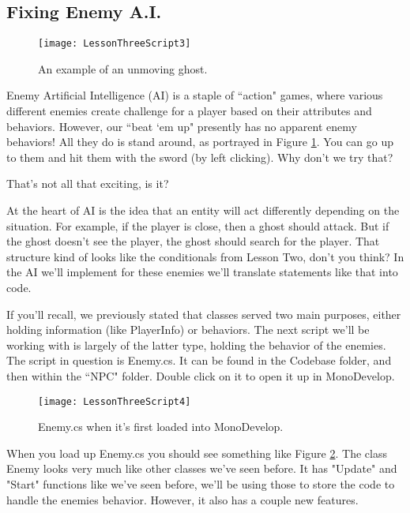 \documentclass{article}
\begin{document}
\subsection{Fixing Enemy A.I.}

\begin{figure}
  \texttt{[image: LessonThreeScript3]}
  \caption{An example of an unmoving ghost.}
  \label{fig:LessonThreeScript3}
\end{figure}

Enemy Artificial Intelligence (AI) is a staple of ``action" games, where various different enemies create challenge for a player based on their attributes and behaviors. However, our ``beat `em up" presently has no apparent enemy behaviors! All they do is stand around, as portrayed in Figure \ref{fig:LessonThreeScript3}. You can go up to them and hit them with the sword (by left clicking). Why don't we try that?

\noindent{}

That's not all that exciting, is it?

At the heart of AI is the idea that an entity will act differently depending on the situation. For example, if the player is close, then a ghost should attack. But if the ghost doesn't see the player, the ghost should search for the player. That structure kind of looks like the conditionals from Lesson Two, don't you think? In the AI we'll implement for these enemies we'll translate statements like that into code.

If you'll recall, we previously stated that classes served two main purposes, either holding information (like PlayerInfo) or behaviors. The next script we'll be working with is largely of the latter type, holding the behavior of the enemies. The script in question is Enemy.cs. It can be found in the Codebase folder, and then within the ``NPC" folder. Double click on it to open it up in MonoDevelop. 

\begin{figure}
  \texttt{[image: LessonThreeScript4]}
  \caption{Enemy.cs when it's first loaded into MonoDevelop.}
  \label{fig:LessonThreeScript4}
\end{figure}

When you load up Enemy.cs you should see something like Figure \ref{fig:LessonThreeScript4}. The class Enemy looks very much like other classes we've seen before. It has "Update" and "Start" functions like we've seen before, we'll be using those to store the code to handle the enemies behavior. However, it also has a couple new features. 
\end{document}
